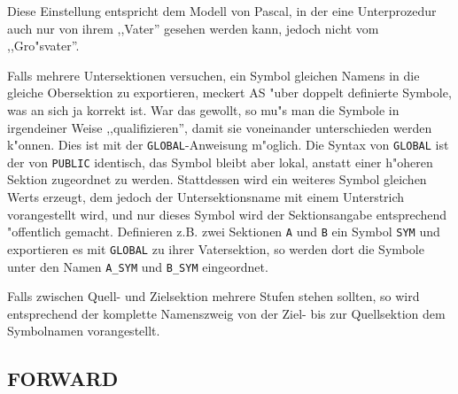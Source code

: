\documentclass[12pt,a4paper,twoside]{report}
\newcommand{\tty}[1]{{\tt #1}}
\newcommand{\asname}{AS}
\begin{document}
Diese Einstellung entspricht dem Modell von Pascal, in der eine
Unterprozedur auch nur von ihrem ,,Vater'' gesehen werden kann, jedoch
nicht vom ,,Gro"svater''.
\par
Falls mehrere Untersektionen versuchen, ein Symbol gleichen Namens
in die gleiche Obersektion zu exportieren, meckert \asname{} "uber doppelt
definierte Symbole, was an sich ja korrekt ist.  War das gewollt,
so mu"s man die Symbole in irgendeiner Weise ,,qualifizieren'', damit
sie voneinander unterschieden werden k"onnen.  Dies ist mit der
\tty{GLOBAL}-Anweisung m"oglich.  Die Syntax von \tty{GLOBAL} ist
der von \tty{PUBLIC} identisch, das Symbol bleibt aber lokal, anstatt
einer h"oheren Sektion zugeordnet zu werden.  Stattdessen wird ein
weiteres Symbol gleichen Werts erzeugt, dem jedoch der Untersektionsname
mit einem Unterstrich vorangestellt wird, und nur dieses Symbol wird der
Sektionsangabe entsprechend "offentlich gemacht.  Definieren z.B. zwei
Sektionen \tty{A} und \tty{B} ein Symbol \tty{SYM} und exportieren
es mit  \tty{GLOBAL} zu ihrer Vatersektion, so werden dort die Symbole
unter den Namen \tty{A\_SYM} und \tty{B\_SYM} eingeordnet.
\par
Falls zwischen Quell- und Zielsektion mehrere Stufen stehen sollten,
so wird entsprechend der komplette Namenszweig von der Ziel- bis zur
Quellsektion dem Symbolnamen vorangestellt.


\subsection{FORWARD}
\end{document}
